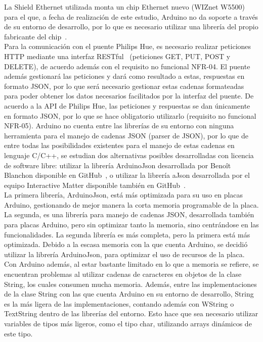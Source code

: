         La Shield Ethernet utilizada monta un chip Ethernet nuevo (WIZnet W5500) para el que, a fecha de realización de este estudio, Arduino no da soporte a través de su entorno de desarrollo, por lo que es necesario utilizar una librería del propio fabricante del chip~\cite{wiznetgit}. \\

        Para la comunicación con el puente Philips Hue, es necesario realizar peticiones HTTP mediante una interfaz RESTful~\cite{howhueworks} (peticiones GET, PUT, POST y DELETE), de acuerdo además con el requisito no funcional NFR-04. El puente además gestionará las peticiones y dará como resultado a estas, respuestas en formato JSON, por lo que será necesario gestionar estas cadenas formateadas para poder obtener los datos necesarios facilitados por la interfaz del puente. De acuerdo a la API de Philips Hue, las peticiones y respuestas se dan únicamente en formato JSON, por lo que se hace obligatorio utilizarlo (requisito no funcional NFR-05). Arduino no cuenta entre las librerías de su entorno con ninguna herramienta para el manejo de cadenas JSON (parser de JSON), por lo que de entre todas las posibilidades existentes para el manejo de estas cadenas en lenguaje C/C++, se estudian dos alternativas posibles desarrolladas con licencia de software libre: utilizar la librería ArduinoJson desarrollada por Benoît Blanchon disponible en GitHub~\cite{arduinojsongit}, o utilizar la librería aJson desarrollada por el equipo Interactive Matter disponible también en GitHub~\cite{ajsongit}. \\

        La primera librería, ArduinoJson, está más optimizada para su uso en placas Arduino, gestionando de mejor manera la corta memoria programable de la placa. La segunda, es una librería para manejo de cadenas JSON, desarrollada también para placas Arduino, pero sin optimizar tanto la memoria, sino centrándose en las funcionalidades. La segunda librería es más completa, pero la primera está más optimizada. Debido a la escasa memoria con la que cuenta Arduino, se decidió utilizar la librería ArduinoJson, para optimizar el uso de recursos de la placa. \\

        Con Arduino además, al estar bastante limitado en lo que a memoria se refiere, se encuentran problemas al utilizar cadenas de caracteres en objetos de la clase String, los cuales consumen mucha memoria. Además, entre las implementaciones de la clase String con las que cuenta Arduino en su entorno de desarrollo, String es la más ligera de las implementaciones, contando además con WString o TextString dentro de las librerías del entorno. Esto hace que sea necesario utilizar variables de tipos más ligeros, como el tipo char, utilizando arrays dinámicos de este tipo.\\

